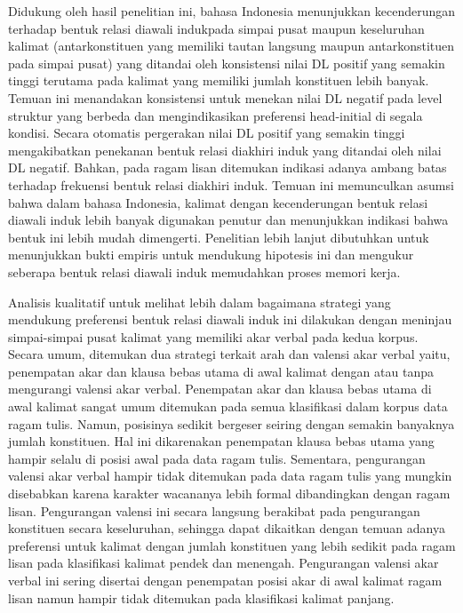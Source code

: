 Didukung oleh hasil penelitian ini, bahasa Indonesia menunjukkan kecenderungan terhadap bentuk relasi diawali indukpada simpai pusat maupun keseluruhan kalimat (antarkonstituen yang memiliki tautan langsung maupun antarkonstituen pada simpai pusat) yang ditandai oleh konsistensi nilai DL positif yang semakin tinggi terutama pada kalimat yang memiliki jumlah konstituen lebih banyak. Temuan ini menandakan konsistensi untuk menekan nilai DL negatif pada level struktur yang berbeda dan mengindikasikan preferensi head-initial di segala kondisi. Secara otomatis pergerakan nilai DL positif yang semakin tinggi mengakibatkan penekanan bentuk relasi diakhiri induk yang ditandai oleh nilai DL negatif. Bahkan, pada ragam lisan ditemukan indikasi adanya ambang batas terhadap frekuensi bentuk relasi diakhiri induk. Temuan ini memunculkan asumsi bahwa dalam bahasa Indonesia, kalimat dengan kecenderungan bentuk relasi diawali induk lebih banyak digunakan penutur dan menunjukkan indikasi bahwa bentuk ini lebih mudah dimengerti. Penelitian lebih lanjut dibutuhkan untuk menunjukkan bukti empiris untuk mendukung hipotesis ini dan mengukur seberapa bentuk relasi diawali induk memudahkan proses memori kerja. 

Analisis kualitatif untuk melihat lebih dalam bagaimana strategi yang mendukung preferensi bentuk relasi diawali induk ini dilakukan dengan meninjau simpai-simpai pusat kalimat yang memiliki akar verbal pada kedua korpus. Secara umum, ditemukan dua strategi terkait arah dan valensi akar verbal yaitu, penempatan akar dan klausa bebas utama di awal kalimat dengan atau tanpa mengurangi valensi akar verbal. Penempatan akar dan klausa bebas utama di awal kalimat sangat umum ditemukan pada semua klasifikasi dalam korpus data ragam tulis. Namun, posisinya sedikit bergeser seiring dengan semakin banyaknya jumlah konstituen. Hal ini dikarenakan penempatan klausa bebas utama yang hampir selalu di posisi awal pada data ragam tulis. Sementara, pengurangan valensi akar verbal hampir tidak ditemukan pada data ragam tulis yang mungkin disebabkan karena karakter wacananya lebih formal dibandingkan dengan ragam lisan. Pengurangan valensi ini secara langsung berakibat pada pengurangan konstituen secara keseluruhan, sehingga dapat dikaitkan dengan temuan adanya preferensi untuk kalimat dengan jumlah konstituen yang lebih sedikit pada ragam lisan pada klasifikasi kalimat pendek dan menengah. Pengurangan valensi akar verbal ini sering disertai dengan penempatan posisi akar di awal kalimat ragam lisan namun hampir tidak ditemukan pada klasifikasi kalimat panjang. 

